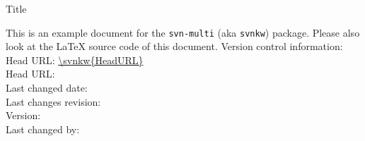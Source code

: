 \documentclass[12pt]{report}
\begin{document}
\begin{titlepage}
 \vspace{8ex}
 {\huge Title\par}
 \vspace{2ex}
 {\large \noindent This is an example document for the \texttt{svn-multi} (aka
 \texttt{svnkw}) package. Please also look at the LaTeX source code of this
 document.}
 \vfill
 \flushleft\sffamily
 Version control information:\\
 Head URL: \url{\svnkw{HeadURL}}\\
 Head URL: \\
 Last changed date: \svndate\\
 Last changes revision: \svnrev\\
 Version: \svnFullRevision*{\svnrev}\\
 Last changed by: \svnFullAuthor*{\svnauthor}\\
\end{titlepage}

\tableofcontents


%
%


%
\makeatletter

\makeatother
\end{document}
